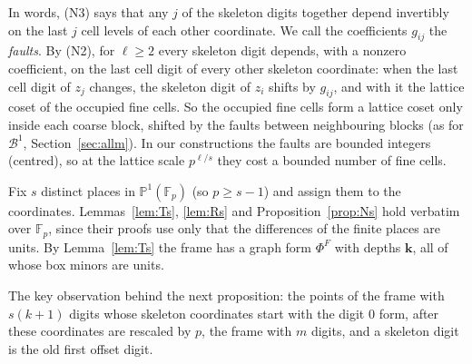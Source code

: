 \documentclass[11pt]{amsart}
\theoremstyle{definition}
\theoremstyle{plain}
\newcommand{\F}{\mathbb{F}}
\begin{document}
In words, (N3) says that any $j$ of the skeleton digits together depend invertibly on the last $j$ cell levels of each other coordinate. We call the coefficients $g_{ij}$ the \emph{faults}. By (N2), for $\ell\ge2$ every skeleton digit depends, with a nonzero coefficient, on the last cell digit of every other skeleton coordinate: when the last cell digit of $z_j$ changes, the skeleton digit of $z_i$ shifts by $g_{ij}$, and with it the lattice coset of the occupied fine cells. So the occupied fine cells form a lattice coset only inside each coarse block, shifted by the faults between neighbouring blocks (as for $\mathcal B^1$, Section~\ref{sec:allm}). In our constructions the faults are bounded integers (centred), so at the lattice scale $p^{\ell/s}$ they cost a bounded number of fine cells.

Fix $s$ distinct places in $\mathbb P^1(\F_p)$ (so $p\ge s-1$) and assign them to the coordinates. Lemmas~\ref{lem:Ts}, \ref{lem:Rs} and Proposition~\ref{prop:Ns} hold verbatim over $\F_p$, since their proofs use only that the differences of the finite places are units. By Lemma~\ref{lem:Ts} the frame has a graph form $\Phi^F$ with depths $\mathbf k$, all of whose box minors are units.

The key observation behind the next proposition: the points of the frame with $s(k+1)$ digits whose skeleton coordinates start with the digit $0$ form, after these coordinates are rescaled by $p$, the frame with $m$ digits, and a skeleton digit is the old first offset digit.
\end{document}
